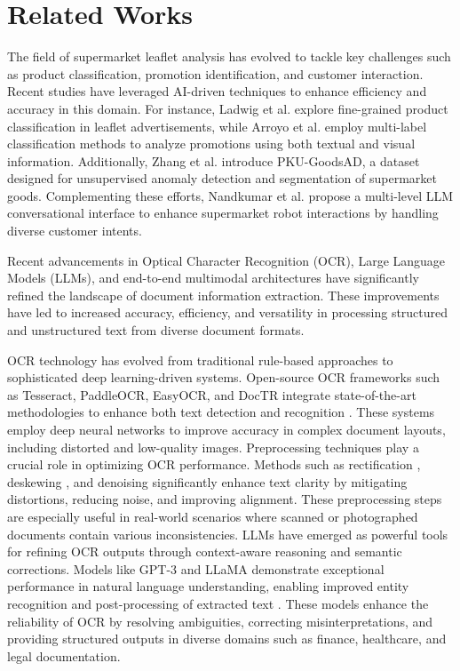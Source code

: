 \documentclass[11pt]{article}
\begin{document}
\section{Related Works}
The field of supermarket leaflet analysis has evolved to tackle key challenges such as product classification, promotion identification, and customer interaction. Recent studies have leveraged AI-driven techniques to enhance efficiency and accuracy in this domain. For instance, Ladwig et al. \cite{ladwig2023} explore fine-grained product classification in leaflet advertisements, while Arroyo et al. \cite{arroyo2020} employ multi-label classification methods to analyze promotions using both textual and visual information. Additionally, Zhang et al. \cite{zhang2024} introduce PKU-GoodsAD, a dataset designed for unsupervised anomaly detection and segmentation of supermarket goods. Complementing these efforts, Nandkumar et al. \cite{nandkumar2024} propose a multi-level LLM conversational interface to enhance supermarket robot interactions by handling diverse customer intents.



Recent advancements in Optical Character Recognition (OCR), Large Language Models (LLMs), and end-to-end multimodal architectures have significantly refined the landscape of document information extraction. These improvements have led to increased accuracy, efficiency, and versatility in processing structured and unstructured text from diverse document formats.

OCR technology has evolved from traditional rule-based approaches to sophisticated deep learning-driven systems. Open-source OCR frameworks such as Tesseract, PaddleOCR, EasyOCR, and DocTR integrate state-of-the-art methodologies to enhance both text detection \cite{liao2019, liao2022} and recognition \cite{shi2015, li2022}. These systems employ deep neural networks to improve accuracy in complex document layouts, including distorted and low-quality images. Preprocessing techniques play a crucial role in optimizing OCR performance. Methods such as rectification \cite{shi2019}, deskewing \cite{pham2022}, and denoising \cite{zhao2018} significantly enhance text clarity by mitigating distortions, reducing noise, and improving alignment. These preprocessing steps are especially useful in real-world scenarios where scanned or photographed documents contain various inconsistencies. LLMs have emerged as powerful tools for refining OCR outputs through context-aware reasoning and semantic corrections. Models like GPT-3 \cite{brown2020} and LLaMA \cite{touvron2023} demonstrate exceptional performance in natural language understanding, enabling improved entity recognition and post-processing of extracted text \cite{yenduri2023}. These models enhance the reliability of OCR by resolving ambiguities, correcting misinterpretations, and providing structured outputs in diverse domains such as finance, healthcare, and legal documentation.
\end{document}
